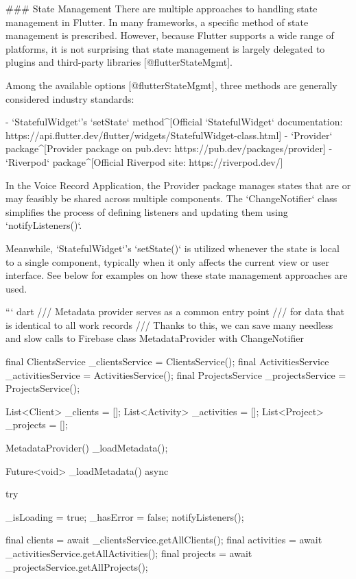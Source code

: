 \documentclass[
  digital,     %
  oneside,     %
  nosansbold,  %
  nocolorbold, %
  lof,         %
  lot,         %
]{fithesis4}
\begin{document}
\begin{markdown}

### State Management
There are multiple approaches to handling state management in Flutter. In many frameworks, a specific method of state management is prescribed. However, because Flutter supports a wide range of platforms, it is not surprising that state management is largely delegated to plugins and third-party libraries [@flutterStateMgmt].

Among the available options [@flutterStateMgmt], three methods are generally considered industry standards:

- `StatefulWidget`'s `setState` method^[Official `StatefulWidget` documentation: https://api.flutter.dev/flutter/widgets/StatefulWidget-class.html]
- `Provider` package^[Provider package on pub.dev: https://pub.dev/packages/provider]
- `Riverpod` package^[Official Riverpod site: https://riverpod.dev/]

In the Voice Record Application, the Provider package manages states that are or may feasibly be shared across multiple components. The `ChangeNotifier` class simplifies the process of defining listeners and updating them using `notifyListeners()`.

Meanwhile, `StatefulWidget`'s `setState()` is utilized whenever the state is local to a single component, typically when it only affects the current view or user interface. See below for examples on how these state management approaches are used.

``` dart
/// Metadata provider serves as a common entry point
/// for data that is identical to all work records
/// Thanks to this, we can save many needless and slow calls to Firebase
class MetadataProvider with ChangeNotifier {
  final ClientsService _clientsService = ClientsService();
  final ActivitiesService _activitiesService = ActivitiesService();
  final ProjectsService _projectsService = ProjectsService();

  List<Client> _clients = [];
  List<Activity> _activities = [];
  List<Project> _projects = [];

  MetadataProvider() {
    _loadMetadata();
  }

  Future<void> _loadMetadata() async {
    try {
      _isLoading = true;
      _hasError = false;
      notifyListeners();

      final clients = await _clientsService.getAllClients();
      final activities = await _activitiesService.getAllActivities();
      final projects = await _projectsService.getAllProjects();

}}}
\end{markdown}
\end{document}
